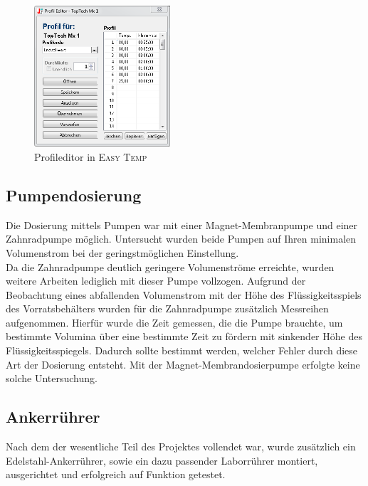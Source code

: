 \documentclass[a4paper, 11pt, draft=false]{scrartcl}
\begin{document}
	\begin{figure}[h!]
		\centering
		\includegraphics[width=0.45\textwidth]{img/julabo_5}
		\caption{Profileditor in \textsc{Easy Temp}}
		\label{fig:tprofil}
	\end{figure}
	\FloatBarrier
	
	\subsection{Pumpendosierung}
	Die Dosierung mittels Pumpen war mit einer Magnet-Membranpumpe und einer Zahnradpumpe möglich. 
	Untersucht wurden beide Pumpen auf Ihren minimalen Volumenstrom bei der geringstmöglichen Einstellung.\\
	Da die Zahnradpumpe deutlich geringere Volumenströme erreichte, wurden weitere Arbeiten lediglich mit dieser Pumpe vollzogen. Aufgrund der Beobachtung eines abfallenden Volumenstrom mit der Höhe des Flüssigkeitsspiels des Vorratsbehälters wurden für die Zahnradpumpe zusätzlich Messreihen aufgenommen. Hierfür wurde die Zeit gemessen, die die Pumpe brauchte, um bestimmte Volumina über eine bestimmte Zeit zu fördern mit sinkender Höhe des Flüssigkeitsspiegels. Dadurch sollte bestimmt werden, welcher Fehler durch diese Art der Dosierung entsteht. Mit der Magnet-Membrandosierpumpe erfolgte keine solche Untersuchung.
	
	\subsection{Ankerrührer}
	Nach dem der wesentliche Teil des Projektes vollendet war, wurde zusätzlich ein Edelstahl-Ankerrührer, sowie ein dazu passender Laborrührer montiert, ausgerichtet und erfolgreich auf Funktion getestet.
	
\end{document}
